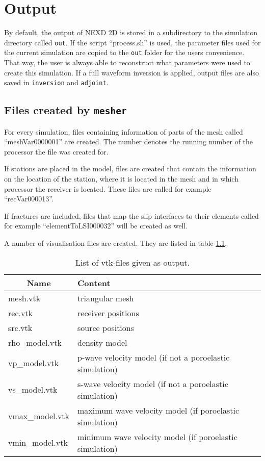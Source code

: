 \chapter{Output}
\label{chap:output}
	By default, the output of NEXD 2D is stored in a subdirectory to the simulation directory called \texttt{out}. If the script ``process.sh'' is used, the parameter files used for the current simulation are copied to the \texttt{out} folder for the users convenience. That way, the user is always able to reconstruct what parameters were used to create this simulation. If a full waveform inversion is applied, output files are also saved in \texttt{inversion} and \texttt{adjoint}.
	
	\section{Files created by \texttt{mesher}}
	\label{sec:mesher}
		For every simulation, files containing information of parts of the mesh called ``meshVar0000001'' are created. The number denotes the running number of the processor the file was created for.
		
		If stations are placed in the model, files are created that contain the information on the location of the station, where it is located in the mesh and in which processor the receiver is located. These files are called for example ``recVar000013''.
		
		If fractures are included, files that map the slip interfaces to their elements called for example ``elementToLSI000032'' will be created as well.
		
		A number of visualisation files are created. They are listed in table \ref{tab:vtk_files}.
		\begin{table}[ht]
   			\centering
    		\caption{List of vtk-files given as output.}
    		\label{tab:vtk_files}
    		\begin{tabular}{@{} l p{9cm} @{}}
        		\toprule
        		\multicolumn{1}{c}{Name} & Content\\ 
        		\midrule
        		mesh.vtk & triangular mesh \\
        		rec.vtk & receiver positions \\    
       			src.vtk & source positions \\
        		rho\_model.vtk & density model \\
        		vp\_model.vtk & p-wave velocity model (if not a poroelastic simulation) \\
        		vs\_model.vtk & s-wave velocity model (if not a poroelastic simulation) \\
        		vmax\_model.vtk & maximum wave velocity model (if poroelastic simulation) \\
        		vmin\_model.vtk & minimum wave velocity model (if poroelastic simulation) \\
        		\bottomrule
    		\end{tabular}
		\end{table}

